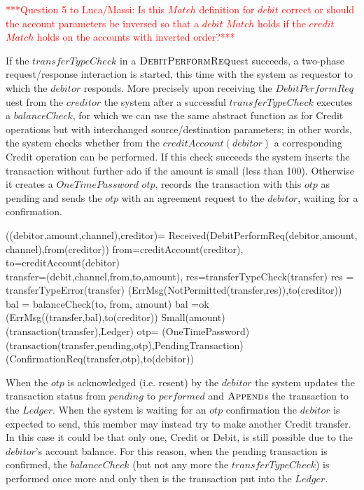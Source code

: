 \vspace{12pt}
\textcolor{red}{***Question 5 to Luca/Massi:  Is this $Match$ definition for $debit$ correct or should the account parameters be inversed so that a $debit$ $Match$ holds if the $credit$ $Match$ holds on the accounts with inverted order?***}
\vspace{12pt}

If the $transferTypeCheck$ in a $ \hbox{\sc DebitPerformReq}$uest succeeds, a two-phase request/response interaction is started, this time with the system as requestor to which the $debitor$ responds. More precisely upon receiving the $DebitPerformReq$uest from the $creditor$ the system after a successful  $transferTypeCheck$ executes a $balanceCheck$, for which we can use the same 
abstract function as for Credit operations but with interchanged source/destination 
parameters; in other words, the system checks whether from the 
$creditAccount(debitor)$ a corresponding Credit operation can be performed. If this 
check succeeds the system inserts the transaction without further ado if the amount is small (less than 
100). Otherwise it creates a $OneTimePassword$ $otp$, records the transaction with this $otp$ as pending and sends the $otp$  with an agreement request to the $debitor$, waiting for a confirmation.


\begin{asm}
((debitor,amount,channel),creditor)=\+
\IF  Received(DebitPerformReq(debitor,amount, channel),from(creditor)) \THEN \+     
  \LET from=creditAccount(creditor), to=creditAccount(debitor)\\
  \LET transfer=(debit,channel,from,to,amount), res=transferTypeCheck(transfer) \+
  \IF res = transferTypeError(transfer) \THEN \+                       (ErrMsg(NotPermitted(transfer,res)),to(creditor))\-
  \ELSE~ \LET bal = balanceCheck(to, from, amount) \+
       \IF bal \not =ok \THEN ~ (ErrMsg((transfer,bal),to(creditor))   \ELSE \+
         \IF Small(amount) \THEN ~ (transaction(transfer),Ledger) \ELSE \+
           \LET otp= \NEW(OneTimePassword)\+
             (transaction(transfer,pending,otp),PendingTransaction)\\   (ConfirmationReq(transfer,otp),to(debitor))
\end{asm}
             
When the $otp$ is acknowledged (i.e. resent) by the $debitor$ 
the system updates the transaction status from $pending$ to $performed$ and 
$\hbox{\sc Append}$s the transaction to the $Ledger$. When the system is waiting for an $otp$ confirmation the $debitor$ is expected to send, this member may instead try to make another Credit transfer. In this case it could be that only one, Credit or Debit, is still possible due to the $debitor$'s account balance. For this reason, when the pending transaction is confirmed, the $balanceCheck$  (but not any more the $transferTypeCheck$) is performed once more and only then is the transaction put into the $Ledger$.  
              
